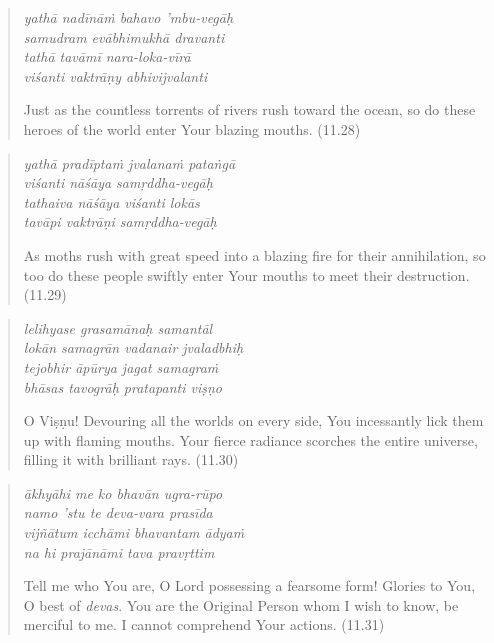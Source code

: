 \documentclass[12pt, twoside, openright]{memoir}
\begin{document}
\par
\begin{verse}
\textit{yathā nadīnāṁ bahavo ’mbu-vegāḥ} \\
\textit{samudram evābhimukhā dravanti} \\
\textit{tathā tavāmī nara-loka-vīrā} \\
\textit{viśanti vaktrāṇy abhivijvalanti}

\noindent Just as the countless torrents of rivers rush toward the ocean, so do these heroes of the world enter Your blazing mouths. (11.28)
\end{verse}
\par



\par
\begin{verse}
\textit{yathā pradīptaṁ jvalanaṁ pataṅgā} \\
\textit{viśanti nāśāya samṛddha-vegāḥ} \\
\textit{tathaiva nāśāya viśanti lokās} \\
\textit{tavāpi vaktrāṇi samṛddha-vegāḥ}

\noindent As moths rush with great speed into a blazing fire for their annihilation, so too do these people swiftly enter Your mouths to meet their destruction. (11.29)
\end{verse}
\par



\par
\begin{verse}
\textit{lelihyase grasamānaḥ samantāl} \\
\textit{lokān samagrān vadanair jvaladbhiḥ} \\
\textit{tejobhir āpūrya jagat samagraṁ} \\
\textit{bhāsas tavogrāḥ pratapanti viṣṇo}

\noindent O Viṣṇu! Devouring all the worlds on every side, You incessantly lick them up with flaming mouths. Your fierce radiance scorches the entire universe, filling it with brilliant rays. (11.30)
\end{verse}
\par



\par
\begin{verse}
\textit{ākhyāhi me ko bhavān ugra-rūpo} \\
\textit{namo ’stu te deva-vara prasīda} \\
\textit{vijñātum icchāmi bhavantam ādyaṁ} \\
\textit{na hi prajānāmi tava pravṛttim}

\noindent Tell me who You are, O Lord possessing a fearsome form! Glories to You, O best of \textit{devas}. You are the Original Person whom I wish to know, be merciful to me. I cannot comprehend Your actions. (11.31)
\end{verse}
\par
\end{document}
